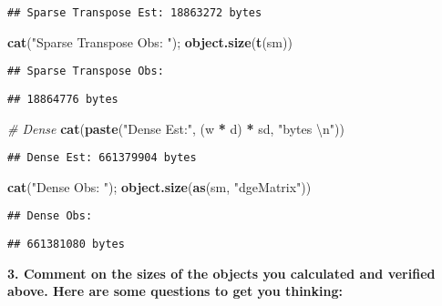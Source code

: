 \documentclass[]{article}
\newenvironment{Shaded}{\begin{snugshade}}{\end{snugshade}}
\newcommand{\CharTok}[1]{\textcolor[rgb]{0.31,0.60,0.02}{#1}}
\newcommand{\CommentTok}[1]{\textcolor[rgb]{0.56,0.35,0.01}{\textit{#1}}}
\newcommand{\KeywordTok}[1]{\textcolor[rgb]{0.13,0.29,0.53}{\textbf{#1}}}
\newcommand{\NormalTok}[1]{#1}
\newcommand{\OperatorTok}[1]{\textcolor[rgb]{0.81,0.36,0.00}{\textbf{#1}}}
\newcommand{\StringTok}[1]{\textcolor[rgb]{0.31,0.60,0.02}{#1}}
\begin{document}
\begin{verbatim}
## Sparse Transpose Est: 18863272 bytes
\end{verbatim}

\begin{Shaded}
\begin{Highlighting}[]
\KeywordTok{cat}\NormalTok{(}\StringTok{"Sparse Transpose Obs: "}\NormalTok{); }\KeywordTok{object.size}\NormalTok{(}\KeywordTok{t}\NormalTok{(sm))}
\end{Highlighting}
\end{Shaded}

\begin{verbatim}
## Sparse Transpose Obs:
\end{verbatim}

\begin{verbatim}
## 18864776 bytes
\end{verbatim}

\begin{Shaded}
\begin{Highlighting}[]
\CommentTok{# Dense}
\KeywordTok{cat}\NormalTok{(}\KeywordTok{paste}\NormalTok{(}\StringTok{"Dense Est:"}\NormalTok{, (w }\OperatorTok{*}\StringTok{ }\NormalTok{d) }\OperatorTok{*}\StringTok{ }\NormalTok{sd, }\StringTok{"bytes }\CharTok{\textbackslash{}n}\StringTok{"}\NormalTok{))}
\end{Highlighting}
\end{Shaded}

\begin{verbatim}
## Dense Est: 661379904 bytes
\end{verbatim}

\begin{Shaded}
\begin{Highlighting}[]
\KeywordTok{cat}\NormalTok{(}\StringTok{"Dense Obs: "}\NormalTok{); }\KeywordTok{object.size}\NormalTok{(}\KeywordTok{as}\NormalTok{(sm, }\StringTok{"dgeMatrix"}\NormalTok{))}
\end{Highlighting}
\end{Shaded}

\begin{verbatim}
## Dense Obs:
\end{verbatim}

\begin{verbatim}
## 661381080 bytes
\end{verbatim}

\textbf{3. Comment on the sizes of the objects you calculated and
verified above. Here are some questions to get you thinking:}
\end{document}
